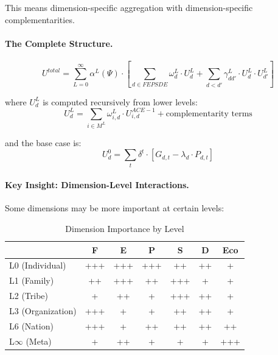 This means dimension-specific aggregation with dimension-specific complementarities.

\paragraph{The Complete Structure.}

\begin{tcolorbox}[colback=green!5!white, colframe=green!75!black, title=AAA $\times$ C: Complete Utility Structure]
\begin{equation}
\boxed{
U^{total} = \sum_{L=0}^{\infty} \alpha^L(\Psi) \cdot \left[ \sum_{d \in FEPSDE} \omega^L_d \cdot U^L_d + \sum_{d < d'} \gamma^L_{dd'} \cdot U^L_d \cdot U^L_{d'} \right]
}
\end{equation}

where $U^L_d$ is computed recursively from lower levels:
\begin{equation}
U^L_d = \sum_{i \in M^L} \omega^L_{i,d} \cdot U^{ACE-1}_{i,d} + \text{complementarity terms}
\end{equation}

and the base case is:
\begin{equation}
U^0_d = \sum_t \delta^t \cdot [G_{d,t} - \lambda_d \cdot P_{d,t}]
\end{equation}
\end{tcolorbox}

\paragraph{Key Insight: Dimension-Level Interactions.}

Some dimensions may be more important at certain levels:

\begin{table}[htbp]
\centering
\caption{Dimension Importance by Level}
\label{tab:aaa-dimension-level}
\renewcommand{\arraystretch}{1.2}
\small
\begin{tabular}{@{}lcccccc@{}}
\toprule
& \textbf{F} & \textbf{E} & \textbf{P} & \textbf{S} & \textbf{D} & \textbf{Eco} \\
\midrule
L0 (Individual) & +++ & +++ & +++ & ++ & ++ & + \\
L1 (Family) & ++ & +++ & ++ & +++ & + & + \\
L2 (Tribe) & + & ++ & + & +++ & ++ & + \\
L3 (Organization) & +++ & + & + & ++ & ++ & + \\
L6 (Nation) & +++ & + & ++ & ++ & ++ & ++ \\
L$\infty$ (Meta) & + & ++ & + & + & + & +++ \\
\bottomrule
\end{tabular}
\end{table}

